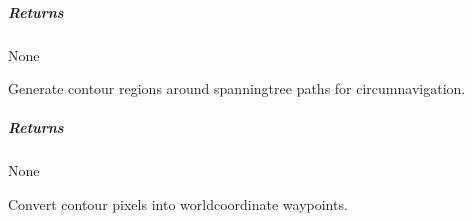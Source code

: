 \documentclass[letterpaper,10pt,english]{sphinxmanual}
\begin{document}
\begin{fulllineitems}
\begin{fulllineitems}
\begin{description}
\end{description}


\subparagraph{Returns}
\label{\detokenize{mirte_lc_nav2.navigators:id20}}
\sphinxAtStartPar
None

\end{fulllineitems}


\begin{fulllineitems}
\label{\detokenize{mirte_lc_nav2.navigators:mirte_lc_nav2.navigators.SpanningTreePath.generate_waypoint_contours}}
\pysigstartsignatures
\pysiglinewithargsret
{}
{}
{}
\pysigstopsignatures
\sphinxAtStartPar
Generate contour regions around spanning\sphinxhyphen{}tree paths for circumnavigation.


\subparagraph{Returns}
\label{\detokenize{mirte_lc_nav2.navigators:id21}}
\sphinxAtStartPar
None

\end{fulllineitems}


\begin{fulllineitems}
\label{\detokenize{mirte_lc_nav2.navigators:mirte_lc_nav2.navigators.SpanningTreePath.get_waypoints}}
\pysigstartsignatures
\pysiglinewithargsret
{}
{}
{}
\pysigstopsignatures
\sphinxAtStartPar
Convert contour pixels into world\sphinxhyphen{}coordinate waypoints.

\end{fulllineitems}


\begin{fulllineitems}
\label{\detokenize{mirte_lc_nav2.navigators:mirte_lc_nav2.navigators.SpanningTreePath.name}}
\pysigstartsignatures
\pysigline
{}
\pysigstopsignatures
\end{fulllineitems}


\end{fulllineitems}
\end{document}
